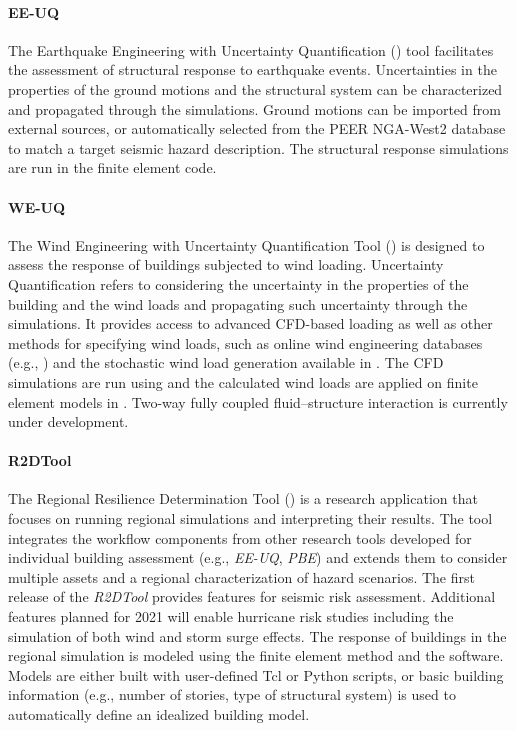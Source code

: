 \paragraph{EE-UQ} 
The Earthquake Engineering with Uncertainty Quantification () tool facilitates the assessment of structural response to earthquake events. Uncertainties in the properties of the ground motions and the structural system can be characterized and propagated through the simulations. Ground motions can be imported from external sources, or automatically selected from the PEER NGA-West2 database \citep{ancheta2014ngawest2} to match a target seismic hazard description. The structural response simulations are run in the  finite element code. 

\paragraph{WE-UQ} 
The Wind Engineering with Uncertainty Quantification Tool () is designed to assess the response of buildings subjected to wind loading. Uncertainty Quantification refers to considering the uncertainty in the properties of the building and the wind loads and propagating such uncertainty through the simulations. It provides access to advanced CFD-based loading as well as other methods for specifying wind loads, such as online wind engineering databases (e.g., \cite{tpu2020tpu}) and the stochastic wind load generation available in . The CFD simulations are run using  and the calculated wind loads are applied on finite element models in . Two-way fully coupled fluid--structure interaction is currently under development.

\paragraph{R2DTool}
The Regional Resilience Determination Tool () is a research application that focuses on running regional simulations and interpreting their results. The tool integrates the workflow components from other research tools developed for individual building assessment (e.g., \emph{EE-UQ}, \emph{PBE}) and extends them to consider multiple assets and a regional characterization of hazard scenarios. The first release of the \emph{R2DTool} provides features for seismic risk assessment. Additional features planned for 2021 will enable hurricane risk studies including the simulation of both wind and storm surge effects. The response of buildings in the regional simulation is modeled using the finite element method and the  software. Models are either built with user-defined Tcl or Python scripts, or basic building information (e.g., number of stories, type of structural system) is used to automatically define an idealized building model. 

